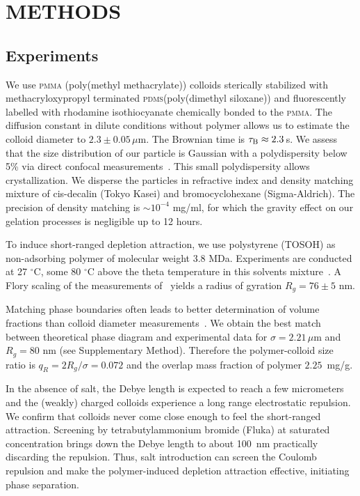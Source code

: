 \documentclass[preprint,amsmath,amssymb,superscriptaddress]{revtex4-1}
\begin{document}



\section*{METHODS}

\subsection*{Experiments}

We use \textsc{pmma} (poly(methyl methacrylate)) colloids sterically stabilized with methacryloxypropyl terminated \textsc{pdms}(poly(dimethyl siloxane)) and fluorescently labelled with rhodamine isothiocyanate chemically bonded to the \textsc{pmma}.
The diffusion constant in dilute conditions without polymer allows us to estimate the colloid diameter to $2.3\pm 0.05\, \mu$m. The Brownian time is $\tau_{\rm B} \approx 2.3\,$s. 
We assess that the size distribution of our particle is Gaussian with a polydispersity below 5\% via direct confocal measurements~\cite{Leocmach2013}.
This small polydispersity allows crystallization.
We disperse the particles in refractive index and density matching mixture of cis-decalin (Tokyo Kasei) and bromocyclohexane (Sigma-Aldrich). 
The precision of density matching is $\sim 10^{-4}$ mg/ml, for which the gravity effect on our gelation processes is negligible up to 12 hours.

To induce short-ranged depletion attraction, we use polystyrene (TOSOH) as non-adsorbing polymer of molecular weight 3.8 MDa.
Experiments are conducted at 27 $^\circ$C, some 80 $^\circ$C above the theta temperature in this solvents mixture~\cite{Royall2007}. A Flory scaling of the measurements of~\cite{lu2008gelation} yields a radius of gyration $R_g=76\pm5$ nm.

Matching phase boundaries often leads to better determination of volume fractions than colloid diameter measurements~\cite{Poon2012}. We obtain the best match between theoretical phase diagram and experimental data for $\sigma=2.21\,\mu$m and $R_g=80$ nm (see Supplementary Method). Therefore the polymer-colloid size ratio is $q_R=2R_g/\sigma=0.072$ and the overlap mass fraction of polymer $2.25$~mg/g.

In the absence of salt, the Debye length is expected to reach a few micrometers and the (weakly) charged colloids experience a long range electrostatic repulsion. We confirm that colloids never come close enough to feel the short-ranged attraction. Screening by tetrabutylammonium bromide (Fluka) at saturated concentration brings down the Debye length to about 100~nm practically discarding the repulsion. 
Thus, salt introduction can screen the Coulomb repulsion and make the polymer-induced depletion attraction effective, initiating phase separation. 
\end{document}
